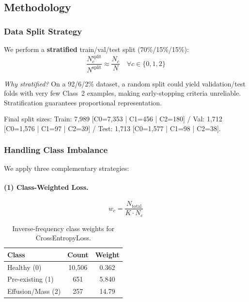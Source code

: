 \documentclass[11pt, letterpaper]{article}
\begin{document}
\subsection{Methodology}
\label{subsec:methodology}

\subsubsection{Data Split Strategy}

We perform a \textbf{stratified} train/val/test split (70\%/15\%/15\%):
\begin{equation}
  \frac{N_c^{\text{split}}}{N^{\text{split}}} \approx \frac{N_c}{N}
  \quad \forall c \in \{0,1,2\}
\end{equation}

\textit{Why stratified?} On a 92/6/2\% dataset, a random split could yield
validation/test folds with very few Class~2 examples, making early-stopping
criteria unreliable. Stratification guarantees proportional representation.

Final split sizes:
Train: 7{,}989 [C0=7,353 | C1=456 | C2=180] /
Val: 1{,}712 [C0=1,576 | C1=97 | C2=39] /
Test: 1{,}713 [C0=1,577 | C1=98 | C2=38].

\subsubsection{Handling Class Imbalance}
\label{subsubsec:imbalance}

We apply three complementary strategies:

\paragraph{(1) Class-Weighted Loss.}
\begin{equation}
  w_c = \frac{N_{\text{total}}}{K \cdot N_c}
  \label{eq:classweights}
\end{equation}
\begin{table}[H]
  \centering
  \caption{Inverse-frequency class weights for CrossEntropyLoss.}
  \begin{tabular}{lcc}
    \toprule
    Class & Count & Weight \\
    \midrule
    Healthy (0)       & 10{,}506 & 0.362 \\
    Pre-existing (1)  & 651      & 5.840 \\
    Effusion/Mass (2) & 257      & 14.79 \\
    \bottomrule
  \end{tabular}
\end{table}
\end{document}
